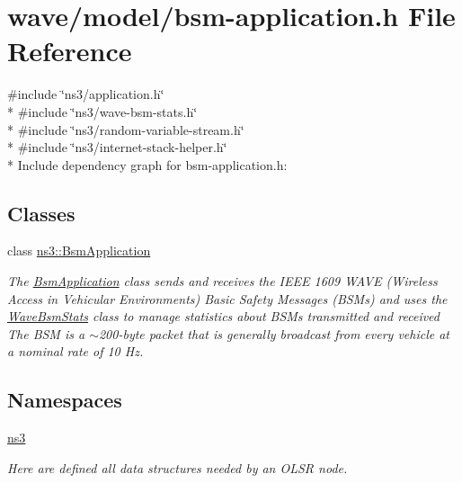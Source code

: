 \hypertarget{bsm-application_8h}{}\section{wave/model/bsm-\/application.h File Reference}
\label{bsm-application_8h}
{\ttfamily \#include \char`\"{}ns3/application.\+h\char`\"{}}\\*
{\ttfamily \#include \char`\"{}ns3/wave-\/bsm-\/stats.\+h\char`\"{}}\\*
{\ttfamily \#include \char`\"{}ns3/random-\/variable-\/stream.\+h\char`\"{}}\\*
{\ttfamily \#include \char`\"{}ns3/internet-\/stack-\/helper.\+h\char`\"{}}\\*
Include dependency graph for bsm-\/application.h\+:
\subsection*{Classes}
\begin{DoxyCompactItemize}
\item 
class \hyperlink{classns3_1_1BsmApplication}{ns3\+::\+Bsm\+Application}
\begin{DoxyCompactList}\small\item\em The \hyperlink{classns3_1_1BsmApplication}{Bsm\+Application} class sends and receives the I\+E\+EE 1609 W\+A\+VE (Wireless Access in Vehicular Environments) Basic Safety Messages (B\+S\+Ms) and uses the \hyperlink{classns3_1_1WaveBsmStats}{Wave\+Bsm\+Stats} class to manage statistics about B\+S\+Ms transmitted and received The B\+SM is a $\sim$200-\/byte packet that is generally broadcast from every vehicle at a nominal rate of 10 Hz. \end{DoxyCompactList}\end{DoxyCompactItemize}
\subsection*{Namespaces}
\begin{DoxyCompactItemize}
\item 
 \hyperlink{namespacens3}{ns3}
\begin{DoxyCompactList}\small\item\em Here are defined all data structures needed by an O\+L\+SR node. \end{DoxyCompactList}\end{DoxyCompactItemize}
